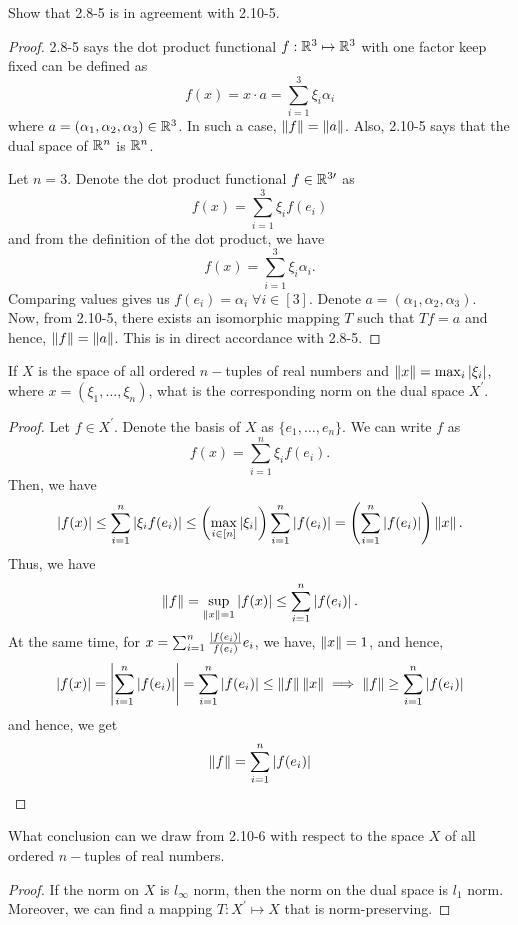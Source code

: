 \begin{question}
    Show that 2.8-5 is in agreement with 2.10-5.
\label{section2.10-5}
\end{question}
\begin{proof}
    2.8-5 says the dot product functional $f : \mathbb{R}^3 \mapsto \mathbb{R}^3$ with one factor keep fixed can be defined as 
    \[f(x) = x \cdot a = \sum_{i=1}^3 \xi_i \alpha_i\]
    where $a = (\alpha_1 , \alpha_2 , \alpha_3) \in \mathbb{R}^3$. In such a case, $\left\lVert f \right\rVert = \left\lVert a \right\rVert$. Also, 2.10-5 says that the dual space of $\mathbb{R}^n$ is $\mathbb{R}^n$.

    Let $n = 3$. Denote the dot product functional $f \in \mathbb{R}^{3\prime}$ as 
    \[f(x) = \sum_{i=1}^3 \xi_i f(e_i)\]
    and from the definition of the dot product, we have
    \[f(x) = \sum_{i=1}^3 \xi_i \alpha_i.\]
    Comparing values gives us $f(e_i) = \alpha_i \;\forall i \in [3].$ Denote $a = (\alpha_1 , \alpha_2 , \alpha_3)$. Now, from 2.10-5, there exists an isomorphic mapping $T$ such that $Tf = a$ and hence, $\left\lVert f \right\rVert = \left\lVert a \right\rVert$. This is in direct accordance with 2.8-5.
\end{proof}

\begin{question}
    If $X$ is the space of all ordered $n-$tuples of real numbers and $\left\lVert x \right\rVert = \max_{i} \left\lvert \xi_i \right\rvert$, where $x = (\xi_1 , \ldots , \xi_n)$, what is the corresponding norm on the dual space $X^\prime$. 
    \label{section2.10-6}
\end{question}
\begin{proof}
    Let $f \in X^\prime$. Denote the basis of $X$ as $\{e_1 , \ldots , e_n\}.$ We can write $f$ as
    \[f(x) = \sum_{i=1}^n \xi_i f(e_i).\]
    Then, we have
    \[\left\lvert f(x) \right\rvert \leq \sum_{i=1}^n \left\lvert \xi_i f(e_i) \right\rvert \leq \left(\max_{i \in [n]} \left\lvert \xi_i \right\rvert \right) \sum_{i=1}^n \left\lvert f(e_i) \right\rvert = \left(\sum_{i=1}^n \left\lvert f(e_i) \right\rvert \right) \left\lVert x \right\rVert.\]
    Thus, we have
    \[\left\lVert f \right\rVert = \sup_{\left\lVert x \right\rVert = 1} \left\lvert f(x) \right\rvert \leq \sum_{i=1}^n \left\lvert f(e_i) \right\rvert.\]
    At the same time, for $x = \sum_{i=1}^n \frac{\left\lvert f(e_i) \right\rvert}{f(e_i)} e_i$, we have, $\left\lVert x \right\rVert = 1$, and hence, 
    \[\left\lvert f(x) \right\rvert = \left\lvert \sum_{i=1}^n \left\lvert f(e_i) \right\rvert \right\rvert = \sum_{i=1}^n \left\lvert f(e_i) \right\rvert \leq \left\lVert f \right\rVert \left\lVert x \right\rVert \implies \left\lVert f \right\rVert \geq  \sum_{i=1}^n \left\lvert f(e_i) \right\rvert\]
    and hence, we get
    \[\left\lVert f \right\rVert =  \sum_{i=1}^n \left\lvert f(e_i) \right\rvert\]
\end{proof}

\begin{question}
    What conclusion can we draw from 2.10-6 with respect to the space $X$ of all ordered $n-$tuples of real numbers.
    \label{section2.10-7}
\end{question}
\begin{proof}
    If the norm on $X$ is $l_\infty$ norm, then the norm on the dual space is $l_1$ norm. Moreover, we can find a mapping $T : X^\prime \mapsto X$ that is norm-preserving.
\end{proof}

